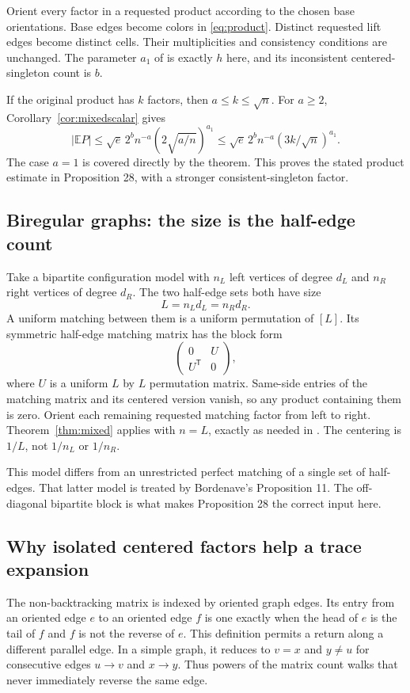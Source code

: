 \documentclass[11pt]{article}
\theoremstyle{definition}
\theoremstyle{remark}
\newcommand{\E}{\mathbb E}
\newcommand{\1}{\mathbf 1}
\begin{document}
Orient every factor in a requested product according to the chosen base orientations. Base edges become colors in \eqref{eq:product}. Distinct requested lift edges become distinct cells. Their multiplicities and consistency conditions are unchanged. The parameter $a_1$ of \cite[Proposition 28]{Bordenave} is exactly $h$ here, and its inconsistent centered-singleton count is $b$.

If the original product has $k$ factors, then $a\le k\le\sqrt n$. For $a\ge2$, Corollary~\ref{cor:mixedscalar} gives
\[
|\E P|\le\sqrt e\,2^bn^{-a}(2\sqrt{a/n})^{a_1}
\le\sqrt e\,2^bn^{-a}(3k/\sqrt n)^{a_1}.
\]
The case $a=1$ is covered directly by the theorem. This proves the stated product estimate in Proposition 28, with a stronger consistent-singleton factor.

\subsection{Biregular graphs: the size is the half-edge count}

Take a bipartite configuration model with $n_L$ left vertices of degree $d_L$ and $n_R$ right vertices of degree $d_R$. The two half-edge sets both have size
\[
L=n_Ld_L=n_Rd_R.
\]
A uniform matching between them is a uniform permutation of $[L]$. Its symmetric half-edge matching matrix has the block form
\[
\begin{pmatrix}0&U\\U^{\mathsf T}&0\end{pmatrix},
\]
where $U$ is a uniform $L$ by $L$ permutation matrix. Same-side entries of the matching matrix and its centered version vanish, so any product containing them is zero. Orient each remaining requested matching factor from left to right. Theorem~\ref{thm:mixed} applies with $n=L$, exactly as needed in \cite[preprint Lemma 7, published Lemma 5.6]{BDH}. The centering is $1/L$, not $1/n_L$ or $1/n_R$.

This model differs from an unrestricted perfect matching of a single set of half-edges. That latter model is treated by Bordenave's Proposition 11. The off-diagonal bipartite block is what makes Proposition 28 the correct input here.

\subsection{Why isolated centered factors help a trace expansion}

The non-backtracking matrix is indexed by oriented graph edges. Its entry from an oriented edge $e$ to an oriented edge $f$ is one exactly when the head of $e$ is the tail of $f$ and $f$ is not the reverse of $e$. This definition permits a return along a different parallel edge. In a simple graph, it reduces to $v=x$ and $y\ne u$ for consecutive edges $u\to v$ and $x\to y$. Thus powers of the matrix count walks that never immediately reverse the same edge.
\end{document}
